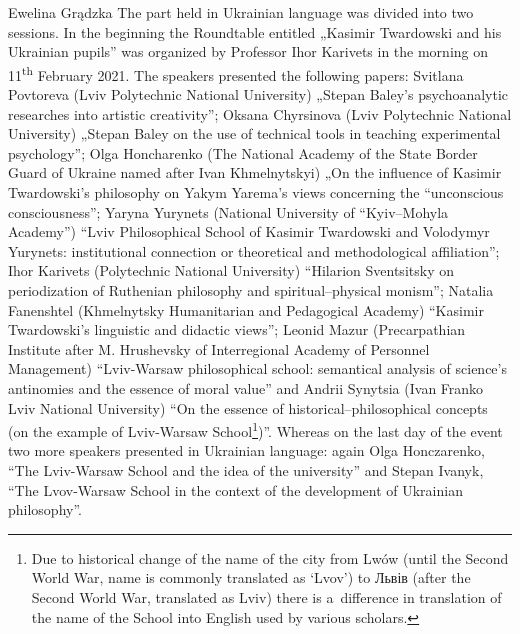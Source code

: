 \begin{editorialeng}{Ewelina Grądzka}
The part held in Ukrainian language was divided into two sessions. In the beginning the Roundtable entitled „Kasimir Twardowski and his Ukrainian pupils” was organized by Professor Ihor Karivets in the morning on 11\textsuperscript{th} February 2021. The speakers presented the following papers: Svitlana Povtoreva (Lviv Polytechnic National University) „Stepan Baley’s psychoanalytic researches into artistic creativity”; Oksana Chyrsinova (Lviv Polytechnic National University) „Stepan Baley on the use of technical tools in teaching experimental psychology”; Olga Honcharenko (The National Academy of the State Border Guard of Ukraine named after Ivan Khmelnytskyi) „On the influence of Kasimir Twardowski’s philosophy on Yakym Yarema’s views concerning the “unconscious consciousness”; Yaryna Yurynets (National University of “Kyiv--Mohyla Academy”) “Lviv Philosophical School of Kasimir Twardowski and Volodymyr Yurynets: institutional connection or theoretical and methodological affiliation”; Ihor Karivets (Polytechnic National University) “Hilarion Sventsitsky on periodization of Ruthenian philosophy and spiritual--physical monism”; Natalia Fanenshtel (Khmelnytsky Humanitarian and Pedagogical Academy) “Kasimir Twardowski’s linguistic and didactic views”; Leonid Mazur (Precarpathian Institute after M. Hrushevsky of Interregional Academy of Personnel Management) “Lviv-Warsaw philosophical school: semantical analysis of science’s antinomies and the essence of moral value” and Andrii Synytsia (Ivan Franko Lviv National University) “On the essence of historical--philosophical concepts (on the example of Lviv-Warsaw School\footnote{ Due to historical change of the name of the city from Lwów (until the Second World War, name is commonly translated as ‘Lvov’) to \foreignlanguage{russian}{Львів} (after the Second World War, translated as Lviv) there is a~difference in translation of the name of the School into English used by various scholars. })”. Whereas on the last day of the event two more speakers presented in Ukrainian language: again Olga Honczarenko, “The Lviv-Warsaw School and the idea of the university” and Stepan Ivanyk, “The Lvov-Warsaw School in the context of the development of Ukrainian philosophy”.


\end{editorialeng}
